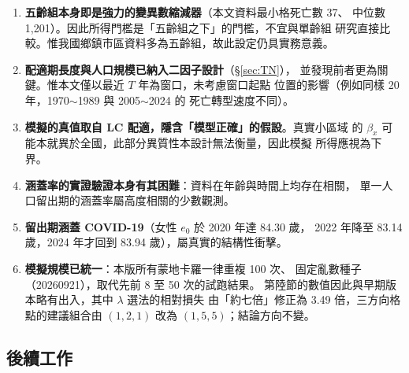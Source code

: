 \documentclass[UTF8, fontset=macnew, a4paper, 12pt]{ctexart}
\begin{document}
\begin{enumerate}[leftmargin=*]
  \item \textbf{五齡組本身即是強力的變異數縮減器}（本文資料最小格死亡數 37、
        中位數 1,201）。因此所得門檻是「五齡組之下」的門檻，不宜與單齡組
        研究直接比較。惟我國鄉鎮市區資料多為五齡組，故此設定仍具實務意義。
  \item \textbf{配適期長度與人口規模已納入二因子設計}（\S\ref{sec:TN}），
        並發現前者更為關鍵。惟本文僅以最近 $T$ 年為窗口，未考慮窗口起點
        位置的影響（例如同樣 20 年，1970$\sim$1989 與 2005$\sim$2024 的
        死亡轉型速度不同）。
  \item \textbf{模擬的真值取自 LC 配適，隱含「模型正確」的假設}。真實小區域
        的 $\beta_x$ 可能本就異於全國，此部分異質性本設計無法衡量，因此模擬
        所得應視為下界。
  \item \textbf{涵蓋率的實證驗證本身有其困難}：資料在年齡與時間上均存在相關，
        單一人口留出期的涵蓋率屬高度相關的少數觀測。
  \item \textbf{留出期涵蓋 COVID-19}（女性 $e_0$ 於 2020 年達 84.30 歲，
        2022 年降至 83.14 歲，2024 年才回到 83.94 歲），屬真實的結構性衝擊。
  \item \textbf{模擬規模已統一}：本版所有蒙地卡羅一律重複 100 次、
        固定亂數種子（20260921），取代先前 8 至 50 次的試跑結果。
        第陸節的數值因此與早期版本略有出入，其中 $\lambda$ 選法的相對損失
        由「約七倍」修正為 3.49 倍，三方向格點的建議組合由 $(1,2,1)$
        改為 $(1,5,5)$；結論方向不變。
\end{enumerate}

\subsection{後續工作}
\end{document}
